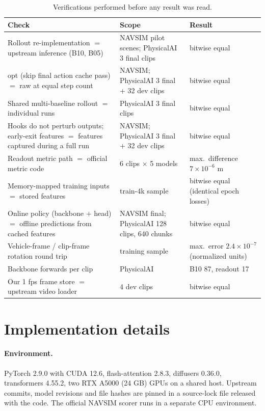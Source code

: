 \documentclass[10pt]{article}
\begin{document}
\begin{table}[H]
\caption{Verifications performed before any result was read.}
\begin{center}
\small
\begin{tabular}{p{7.5cm}p{3.8cm}p{3cm}}
\toprule
Check & Scope & Result \\
\midrule
Rollout re-implementation $=$ upstream inference (B10, B05) & NAVSIM pilot scenes; PhysicalAI 3 final clips & bitwise equal \\
opt (skip final action cache pass) $=$ raw at equal step count & NAVSIM; PhysicalAI 3 final + 32 dev clips & bitwise equal \\
Shared multi-baseline rollout $=$ individual runs & PhysicalAI 3 final clips & bitwise equal \\
Hooks do not perturb outputs; early-exit features $=$ features captured during a full run & NAVSIM; PhysicalAI 3 final + 32 dev clips & bitwise equal \\
Readout metric path $=$ official metric code & 6 clips $\times$ 5 models & max.\ difference $7 \times 10^{-6}$ m \\
Memory-mapped training inputs $=$ stored features & train-4k sample & bitwise equal (identical epoch losses) \\
Online policy (backbone $+$ head) $=$ offline predictions from cached features & NAVSIM final; PhysicalAI 128 clips, 640 chunks & bitwise equal \\
Vehicle-frame / clip-frame rotation round trip & training sample & max.\ error $2.4 \times 10^{-7}$ (normalized units) \\
Backbone forwards per clip & PhysicalAI & B10 87, readout 17 \\
Our 1 fps frame store $=$ upstream video loader & 4 dev clips & bitwise equal \\
\bottomrule
\end{tabular}
\end{center}
\end{table}

\section{Implementation details}
\label{app:impl}

\paragraph{Environment.} PyTorch 2.9.0 with CUDA 12.6, flash-attention 2.8.3, diffusers 0.36.0, transformers 4.55.2, two RTX A5000 (24 GB) GPUs on a shared host. Upstream commits, model revisions and file hashes are pinned in a source-lock file released with the code. The official NAVSIM scorer runs in a separate CPU environment.
\end{document}
